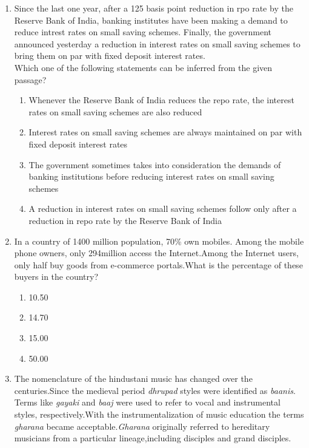 \documentclass[12pt]{article}
\begin{document}
\begin{enumerate}[start=6,label=Q.\arabic*]
	\item Since the last one year, after a 125 basis point reduction in rpo rate by the Reserve Bank of India, banking institutes have been making a demand to reduce intrest rates on small saving schemes. Finally, the government announced yesterday a reduction in interest rates on small saving schemes to bring them on par with fixed deposit interest rates.\\
		Which one of the following statements can be inferred from the given passage?
		\begin{enumerate}[label=(\Alph*)]
			\item Whenever the Reserve Bank of India reduces the repo rate, the interest rates on small saving schemes are also reduced
			\item Interest rates on small saving schemes are always maintained on par with fixed  deposit interest rates 
			\item The government sometimes takes into consideration the demands of  banking institutions before reducing interest rates on small saving schemes
			\item A reduction in interest rates on small saving schemes follow only after a reduction in repo rate by the Reserve Bank of India
		\end{enumerate}
	\item In a country of 1400 million population, 70\% own mobiles. Among the mobile phone owners, only 294million access the Internet.Among the Internet users, only half buy goods from e-commerce portals.What is the percentage of these buyers in the country?
		\begin{multicols}{4}
			\begin{enumerate}[label=(\Alph*)]
				\item 10.50 \item 14.70 \item 15.00 \item 50.00
			\end{enumerate}
		\end{multicols}
	\item The nomenclature of the hindustani music has changed over the centuries.Since the medieval period \textit{dhrupad} styles were identified as \textit{baanis}. Terms like \textit{gayaki} and \textit{baaj} were used to refer to vocal and instrumental styles, respectively.With the instrumentalization of music education the terms \textit{gharana} became acceptable.\textit{Gharana} originally referred to hereditary musicians from a particular lineage,including disciples and grand disciples.\\

\end{enumerate}
\end{document}
